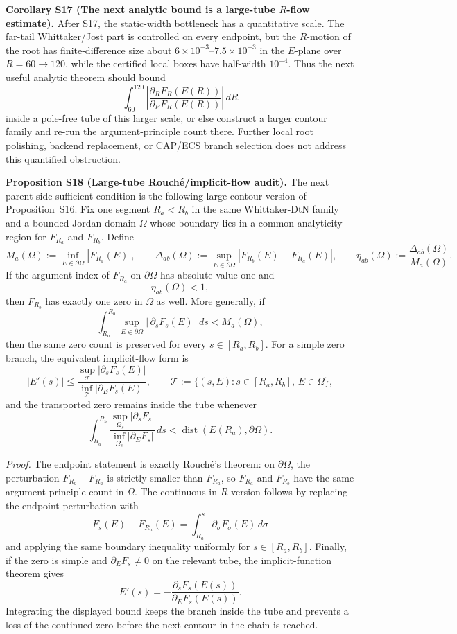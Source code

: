 \documentclass[aps,prd,onecolumn,notitlepage,nofootinbib,superscriptaddress,11pt,floatfix]{revtex4-2}
\begin{document}
\medskip\noindent\textbf{Corollary S17 (The next analytic bound is a large-tube \(R\)-flow estimate).}
After S17, the static-width bottleneck has a quantitative scale.  The far-tail Whittaker/Jost part is controlled on every endpoint, but the \(R\)-motion of the root has finite-difference size about \(6\times10^{-3}\)--\(7.5\times10^{-3}\) in the \(E\)-plane over \(R=60\to120\), while the certified local boxes have half-width \(10^{-4}\).  Thus the next useful analytic theorem should bound
\[
\int_{60}^{120}
\left|
\frac{\partial_R F_R(E(R))}{\partial_E F_R(E(R))}
\right|\,dR
\]
inside a pole-free tube of this larger scale, or else construct a larger contour family and re-run the argument-principle count there.  Further local root polishing, backend replacement, or CAP/ECS branch selection does not address this quantified obstruction.

\medskip\noindent\textbf{Proposition S18 (Large-tube Rouché/implicit-flow audit).}
The next parent-side sufficient condition is the following large-contour version of Proposition~S16.  Fix one segment \(R_a<R_b\) in the same Whittaker-DtN family and a bounded Jordan domain \(\Omega\) whose boundary lies in a common analyticity region for \(F_{R_a}\) and \(F_{R_b}\).  Define
\[
M_a(\Omega):=\inf_{E\in\partial\Omega}|F_{R_a}(E)|,
\qquad
\Delta_{ab}(\Omega):=
\sup_{E\in\partial\Omega}|F_{R_b}(E)-F_{R_a}(E)|,
\qquad
\eta_{ab}(\Omega):=\frac{\Delta_{ab}(\Omega)}{M_a(\Omega)}.
\]
If the argument index of \(F_{R_a}\) on \(\partial\Omega\) has absolute value one and
\[
\eta_{ab}(\Omega)<1,
\]
then \(F_{R_b}\) has exactly one zero in \(\Omega\) as well.  More generally, if
\[
\int_{R_a}^{R_b}
\sup_{E\in\partial\Omega}|\,\partial_sF_s(E)\,|\,ds
<
M_a(\Omega),
\]
then the same zero count is preserved for every \(s\in[R_a,R_b]\).  For a simple zero branch, the equivalent implicit-flow form is
\[
\left|E'(s)\right|
\le
\frac{\sup_{\mathcal T}|\partial_sF_s(E)|}
     {\inf_{\mathcal T}|\partial_EF_s(E)|},
\qquad
\mathcal T:=\{(s,E):s\in[R_a,R_b],\,E\in\Omega\},
\]
and the transported zero remains inside the tube whenever
\[
\int_{R_a}^{R_b}
\frac{\sup_{\Omega_s}|\partial_sF_s|}
     {\inf_{\Omega_s}|\partial_EF_s|}\,ds
<
\operatorname{dist}(E(R_a),\partial\Omega).
\]

\emph{Proof.}
The endpoint statement is exactly Rouché's theorem: on \(\partial\Omega\), the perturbation \(F_{R_b}-F_{R_a}\) is strictly smaller than \(F_{R_a}\), so \(F_{R_a}\) and \(F_{R_b}\) have the same argument-principle count in \(\Omega\).  The continuous-in-\(R\) version follows by replacing the endpoint perturbation with
\[
F_s(E)-F_{R_a}(E)=\int_{R_a}^{s}\partial_\sigma F_\sigma(E)\,d\sigma
\]
and applying the same boundary inequality uniformly for \(s\in[R_a,R_b]\).  Finally, if the zero is simple and \(\partial_EF_s\ne0\) on the relevant tube, the implicit-function theorem gives
\[
E'(s)=-\frac{\partial_sF_s(E(s))}{\partial_EF_s(E(s))}.
\]
Integrating the displayed bound keeps the branch inside the tube and prevents a loss of the continued zero before the next contour in the chain is reached.
\end{document}
